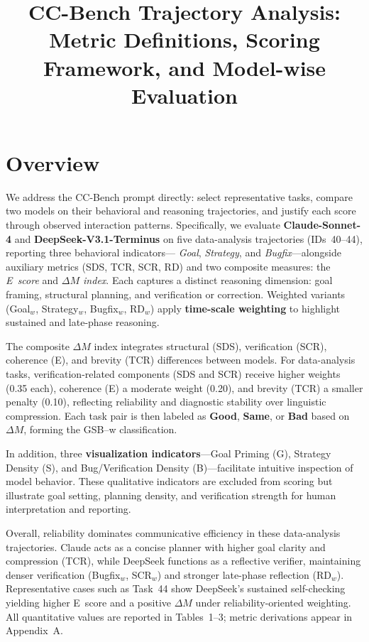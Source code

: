 \documentclass[11pt]{article}
\title{CC-Bench Trajectory Analysis: Metric Definitions, Scoring Framework, and Model-wise Evaluation}
\author{}
\begin{document}
\maketitle
\section{Overview}
We address the CC-Bench prompt directly: select representative tasks, compare two models on
their behavioral and reasoning trajectories, and justify each score through observed interaction
patterns. Specifically, we evaluate \textbf{Claude-Sonnet-4} and \textbf{DeepSeek-V3.1-Terminus}
on five data-analysis trajectories (IDs~40–44), reporting three behavioral indicators—
\textit{Goal}, \textit{Strategy}, and \textit{Bugfix}—alongside auxiliary metrics
(SDS, TCR, SCR, RD) and two composite measures: the \textit{E~score} and
\textit{$\Delta M$ index}. Each captures a distinct reasoning dimension:
goal framing, structural planning, and verification or correction. 
Weighted variants (Goal$_w$, Strategy$_w$, Bugfix$_w$, RD$_w$) apply
\textbf{time-scale weighting} to highlight sustained and late-phase reasoning.

The composite $\Delta M$ index integrates structural (SDS), verification (SCR), coherence (E),
and brevity (TCR) differences between models. For data-analysis tasks, verification-related
components (SDS and SCR) receive higher weights (0.35 each), coherence (E) a moderate weight (0.20),
and brevity (TCR) a smaller penalty (0.10), reflecting reliability and diagnostic stability
over linguistic compression. Each task pair is then labeled as \textbf{Good}, \textbf{Same}, or
\textbf{Bad} based on $\Delta M$, forming the GSB–w classification.

In addition, three \textbf{visualization indicators}—Goal Priming (G), Strategy Density (S),
and Bug/Verification Density (B)—facilitate intuitive inspection of model behavior.
These qualitative indicators are excluded from scoring but illustrate goal setting,
planning density, and verification strength for human interpretation and reporting.

Overall, reliability dominates communicative efficiency in these data-analysis trajectories.
Claude acts as a concise planner with higher goal clarity and compression (TCR),
while DeepSeek functions as a reflective verifier, maintaining denser verification
(Bugfix$_w$, SCR$_w$) and stronger late-phase reflection (RD$_w$).
Representative cases such as Task~44 show DeepSeek’s sustained self-checking yielding higher
E~score and a positive $\Delta M$ under reliability-oriented weighting.
All quantitative values are reported in Tables~1–3; metric derivations appear in Appendix~A.
\end{document}
